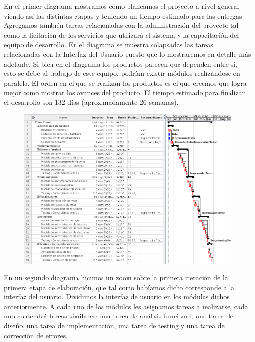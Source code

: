 \par

En el primer diagrama mostramos cómo planeamos el proyecto a nivel general viendo así las distintas etapas y teniendo un tiempo estimado para las entregas. Agregamos tambi\'en tareas relacionadas con la administración del proyecto tal como la licitaci\'on de los servicios que utilizará el sistema y la capacitación del equipo de desarrollo. En el diagrama se muestra colapsadas las tareas relacionadas con la Interfaz del Usuario puesto que lo mostraremos en detalle más adelante. Si bien en el diagrama los productos parecen que dependen entre si, esto se debe al trabajo de este equipo, podrían existir módulos realizándose en paralelo. El orden en el que se realizan los productos es el que creemos que logra mejor como mostrar los avances del producto. El tiempo estimado para finalizar el desarrollo son 132 días (aproximadamente 26 semanas).	

\par
\begin{figure}[H]
\begin{center}
\includegraphics[scale=0.6]{./imagenes/gantintegral.png}
\end{center}
\end{figure}

\par
En un segundo diagrama hicimos un zoom sobre la primera iteración de la primera etapa de elaboración, que tal como habíamos dicho corresponde a la interfaz del usuario. Dividimos la interfaz de usuario en los m\'odulos dichos anteriormente. A cada uno de los m\'odulos les asignamos tareas a realizarse, cada uno contendrá tareas similares: una tarea de an\'alisis funcional, una tarea de diseño, una tarea de implementaci\'on, una tarea de testing y una tarea de correcci\'on de errores.


